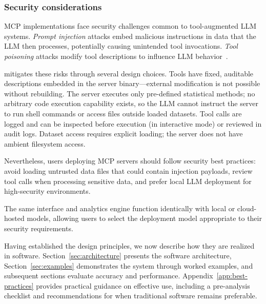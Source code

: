 \subsubsection{Security considerations}

MCP implementations face security challenges common to tool-augmented
LLM systems. \emph{Prompt injection} attacks embed malicious instructions
in data that the LLM then processes, potentially causing unintended
tool invocations. \emph{Tool poisoning} attacks modify tool descriptions
to influence LLM behavior~\citep{OWASP:MCP:2025}.

 mitigates these risks through several design
choices. Tools have fixed, auditable descriptions embedded in the server
binary---external modification is not possible without rebuilding. The
server executes only pre-defined statistical methods; no arbitrary code
execution capability exists, so the LLM cannot instruct the server to run
shell commands or access files outside loaded datasets. Tool calls are
logged and can be inspected before execution (in interactive mode) or
reviewed in audit logs. Dataset access requires explicit loading; the
server does not have ambient filesystem access.

Nevertheless, users deploying MCP servers should follow security best
practices: avoid loading untrusted data files that could contain
injection payloads, review tool calls when processing sensitive data,
and prefer local LLM deployment for high-security environments.

The same interface and analytics engine function identically with
local or cloud-hosted models, allowing users to select the deployment
model appropriate to their security requirements.



Having established the design principles, we now describe how they are
realized in software. Section~\ref{sec:architecture} presents the software
architecture, Section~\ref{sec:examples} demonstrates the system through
worked examples, and subsequent sections evaluate accuracy and performance.
Appendix~\ref{app:best-practices} provides practical guidance on effective
use, including a pre-analysis checklist and recommendations for when
traditional software remains preferable.

